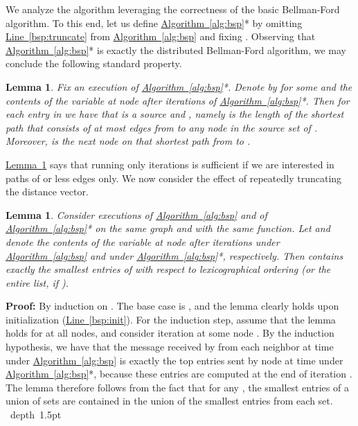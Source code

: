 \documentclass[letterpaper,11pt]{article}
\newcommand{\namedref}[2]{\hyperref[#2]{#1~\ref*{#2}}}
\newcommand{\lemmaref}[1]{\namedref{Lemma}{#1}}
\newcommand{\algref}[1]{\namedref{Algorithm}{#1}}
\newcommand{\lineref}[1]{\namedref{Line}{#1}}
\newtheorem{lemma}[theorem]{Lemma}
\newcommand{\blackslug}{\hbox{\hskip 1pt \vrule width 4pt height 8pt
depth 1.5pt \hskip 1pt}}
\newcommand{\QED}{\quad\blackslug\lower 8.5pt\null\par}
\newenvironment{proof}[1][Proof:]{\noindent \textbf{#1}\xspace}{\QED}
\begin{document}
We analyze the algorithm leveraging the correctness of the basic Bellman-Ford
algorithm. To this end, let us define \algref{alg:bsp}* by omitting
\lineref{bsp:truncate} from \algref{alg:bsp} and fixing . Observing that
\algref{alg:bsp}* is exactly the distributed Bellman-Ford algorithm, we may
conclude the following standard property.

\begin{lemma}\label{lem:bf}
Fix an execution of \algref{alg:bsp}*. Denote by  for some  and  the contents of the  variable at node  after 
iterations of \algref{alg:bsp}*. Then for each  entry in 
we have that  is a source and , namely  is the length of the shortest path that
consists of at most  edges from  to any node  in the source set of .
Moreover,  is the next node on that shortest path from  to .
\end{lemma}

\lemmaref{lem:bf} says that running only  iterations is sufficient if we
are interested in paths of  or less edges only. We now consider the effect of
repeatedly truncating the distance vector.

\begin{lemma}\label{lem:bsp_trunc}
Consider executions of \algref{alg:bsp} and of \algref{alg:bsp}* on the same
graph and with the same  function. Let  and
 denote the contents of the  variable at node  after 
iterations under \algref{alg:bsp} and under \algref{alg:bsp}*, respectively.
Then  contains exactly the smallest  entries of  with
respect to lexicographical ordering (or the entire list, if ).
\end{lemma}
\begin{proof}
By induction on . The base case is , and the lemma clearly holds upon
initialization (\lineref{bsp:init}). For the induction step, assume that the
lemma holds for  at all nodes, and consider iteration
 at some node . By the induction hypothesis, we have that the message
received by  from each neighbor  at time  under \algref{alg:bsp} is
exactly the top  entries sent by node  at time  under
\algref{alg:bsp}*, because these entries are computed at the end of iteration
. The lemma therefore follows from the fact that for any , the
smallest  entries of a union of sets are contained in the union of the
smallest  entries from each set.
\end{proof}
\end{document}
